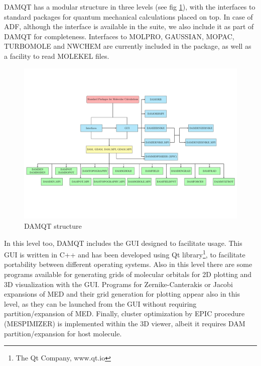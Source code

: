 \documentclass[10pt]{article}
\begin{document}
DAMQT has a modular structure in three levels (see fig \ref{fig:1}), with
the interfaces to standard packages for quantum mechanical calculations placed on top. 
In case of ADF, although the interface is available in the suite, we also include it 
as part of DAMQT for completeness. Interfaces to MOLPRO,
GAUSSIAN, MOPAC, TURBOMOLE and NWCHEM are currently included in the package, 
as well as a facility to read MOLEKEL \mkl{ } files.

\begin{figure}[H]
\vspace*{-2cm}
\begin{center}
\includegraphics[width=1\linewidth]{DAMQT_structure.pdf}
\end{center}
\vspace*{-2.5cm}
\caption{DAMQT structure \label{fig:1}}
\end{figure}

In this level too, DAMQT includes the GUI designed to facilitate usage.
This GUI is written in C++ and has been developed using 
Qt library\footnote{The Qt Company, www.qt.io}, 
to facilitate portability between different operating systems.
Also in this level there are some programs available for generating grids of 
molecular orbitals for 2D plotting and 3D visualization with the GUI.
Programs for Zernike-Canterakis or Jacobi expansions
of MED and their grid generation for plotting appear also in this level, as they can be launched from the GUI 
without requiring partition/expansion of MED.
Finally, cluster optimization by EPIC procedure (MESPIMIZER) is implemented within the 3D viewer, albeit
it requires DAM partition/expansion for host molecule. 
\end{document}
